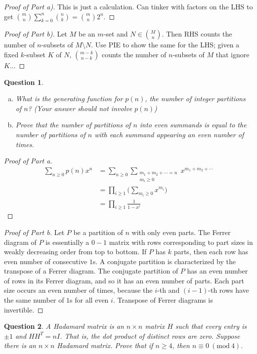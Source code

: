 \documentclass[12]{article}
\newcommand{\Mod}[1]{\ (\mathrm{mod}\ #1)}
\newtheorem{question}{Question}
\theoremstyle{definition}
\begin{document}
		\begin{proof}[Proof of Part a)]
			This is just a calculation.  Can tinker with factors on the LHS to get ${m \choose n}\sum_{k=0}^n {n \choose k} = {m \choose n}2^{n}$.
		\end{proof}
		
		\begin{proof}[Proof of Part b)]
			Let $M$ be an $m$-set and $N \in {M \choose n}$.  Then RHS counts the number of $n$-subsets of $M\setminus N$.  Use PIE to show the same for the LHS; given a fixed $k$-subset $K$ of $N$, ${m - k \choose n-k}$ counts the number of $n$-subsets of $M$ that ignore $K$...
		\end{proof}

	\begin{question}
		\
		\begin{enumerate}[a)]
			\item What is the generating function for $p(n)$, the number of integer partitions of $n$? (Your answer should not involve $p(n)$)
			\item Prove that the number of partitions of $n$ into even summands is equal to the number of partitions of $n$ with each summand appearing an even number of times.
		\end{enumerate}
	\end{question}
	\begin{proof}[Proof of Part a]
		\begin{align*}
			\sum_{n \geq 0}p(n)x^n &= \sum_{n \geq 0} \sum_{\substack{m_1 + m_2 + \cdots = n \\ m_i \geq 0}} x^{m_1 + m_2 + \cdots}	\\
			&= \prod_{i \geq 1} \biggr(\sum_{m_i \geq 0} x^{m_i}\biggr)	\\
			&= \prod_{i \geq 1} \frac{1}{1-x^{i}}
		\end{align*}
	\end{proof}

	\begin{proof}[Proof of Part b]
		Let $P$ be a partition of $n$ with only even parts.  The Ferrer diagram of $P$ is essentially a $0-1$ matrix with rows corresponding to part sizes in weakly decreasing order from top to bottom.  If $P$ has $k$ parts, then each row has even number of consecutive $1$s.  A conjugate partition is characterized by the transpose of a Ferrer diagram.  The conjugate partition of $P$ has an even number of rows in its Ferrer diagram, and so it has an even number of parts.  Each part size occurs an even number of times, because the $i$-th and $(i-1)$-th rows have the same number of $1$s for all even $i$.   Transpose of Ferrer diagrams is invertible.
	\end{proof}
	\begin{question}
		A Hadamard matrix is an $n \times n$ matrix $H$ such that every entry is $\pm 1$ and $HH^T = nI$.  That is, the dot product of distinct rows are zero.  Suppose there is an $n \times n$ Hadamard matrix.  Prove that if $n \geq 4$, then $n \equiv 0 \Mod{4}$.
	\end{question}
	
\end{document}
